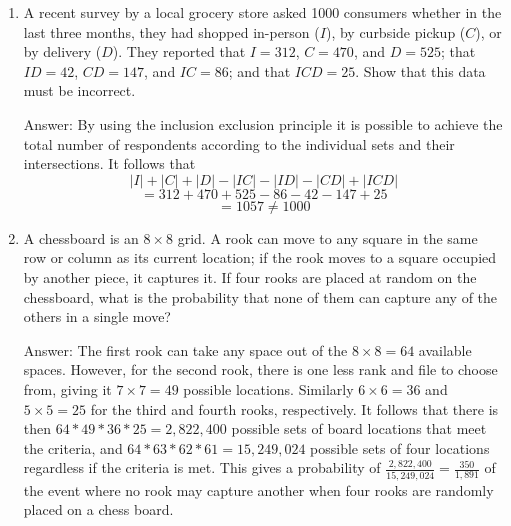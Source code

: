 \documentclass{article}
\begin{document}
\begin{enumerate}
    \item A recent survey by a local grocery store asked 1000 consumers whether in the last three months, they had shopped in-person ($I$), by curbside pickup ($C$), or by delivery ($D$). They reported that $I = 312$, $C = 470$, and $D = 525$; that $ID = 42$, $CD = 147$, and $IC = 86$; and that $ICD = 25$. Show that this data must be incorrect.

        Answer:
        By using the inclusion exclusion principle it is possible to achieve the total number of respondents according to the individual sets and their intersections. It follows that 
        $$
            |I| + |C| + |D| - |IC| - |ID| - |CD| + |ICD|
        $$
        $$
            = 312 + 470 + 525 - 86 - 42 - 147 + 25
        $$
        $$
            = 1057 \neq 1000
        $$

    \clearpage

    \item A chessboard is an $8 \times 8$ grid. A rook can move to any square in the same row or column as its current location; if the rook moves to a square occupied by another piece, it captures it. If four rooks are placed at random on the chessboard, what is the probability that none of them can capture any of the others in a single move?

        Answer:
        The first rook can take any space out of the $8 \times 8 = 64$ available spaces. However, for the second rook, there is one less rank and file to choose from, giving it $7 \times 7 = 49$ possible locations. Similarly $6 \times 6 = 36$ and $5 \times 5 = 25$ for the third and fourth rooks, respectively. It follows that there is then $64*49*36*25 = 2,822,400$ possible sets of board locations that meet the criteria, and $64*63*62*61=15,249,024$ possible sets of four locations regardless if the criteria is met. This gives a probability of $\frac{2,822,400}{15,249,024} = \frac{350}{1,891}$ of the event where no rook may capture another when four rooks are randomly placed on a chess board.
        
\end{enumerate}
\end{document}
